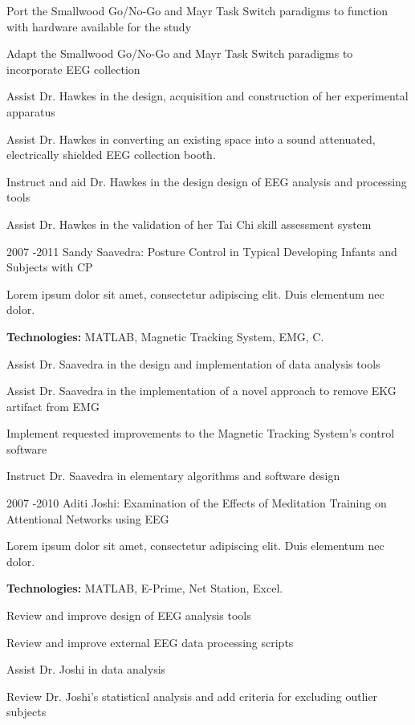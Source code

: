 \documentclass[10pt]{article} %
\begin{document}
\begin{itemize-noindent}
\begin{itemize-noindent}
\item{Port the Smallwood Go/No-Go and Mayr Task Switch paradigms to function with hardware available for the study}
\item{Adapt the Smallwood Go/No-Go and Mayr Task Switch paradigms to incorporate EEG collection}
\item{Assist Dr. Hawkes in the design, acquisition and construction of her experimental apparatus}
\item{Assist Dr. Hawkes in converting an existing space into a sound attenuated, electrically shielded EEG collection booth.}
\item{Instruct and aid Dr. Hawkes in the design design of EEG analysis and processing tools}
\item{Assist Dr. Hawkes in the validation of her Tai Chi skill assessment system}
\end{itemize-noindent}


\job
{2007 -}{2011}
{Sandy Saavedra: Posture Control in Typical Developing Infants and Subjects with CP}
{Lorem ipsum dolor sit amet, consectetur adipiscing elit. Duis elementum nec dolor. \\
\rule{0mm}{5mm}\textbf{Technologies:} MATLAB, Magnetic Tracking System, EMG, C.}

\begin{itemize-noindent}
\item{Assist Dr. Saavedra in the design and implementation of data analysis tools}
\item{Assist Dr. Saavedra in the implementation of a novel approach to remove EKG artifact from EMG}
\item{Implement requested improvements to the Magnetic Tracking System's control software}
\item{Instruct Dr. Saavedra in elementary algorithms and software design}
\end{itemize-noindent}


\job
{2007 -}{2010}
{Aditi Joshi: Examination of the Effects of Meditation Training on Attentional Networks using EEG}
{Lorem ipsum dolor sit amet, consectetur adipiscing elit. Duis elementum nec dolor. \\
\rule{0mm}{5mm}\textbf{Technologies:} MATLAB, E-Prime, Net Station, Excel.}

\begin{itemize-noindent}
\item{Review and improve design of EEG analysis tools}
\item{Review and improve external EEG data processing scripts}
\item{Assist Dr. Joshi in data analysis}
\item{Review Dr. Joshi's statistical analysis and add criteria for excluding outlier subjects}
\end{itemize-noindent}


\end{itemize-noindent}
\end{document}
